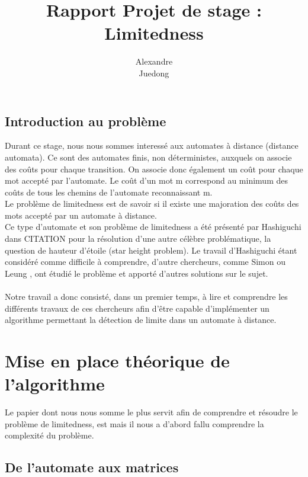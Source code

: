 \documentclass{report}
\title{\textbf{Rapport Projet de stage : Limitedness}}
\author{
\bsc {Brebant} Alexandre\\
\bsc {Xue} Juedong}
\begin{document}
\maketitle

\tableofcontents
\chapter*{Introduction au problème}
Durant ce stage, nous nous sommes interessé aux automates à distance (distance automata). Ce sont des automates finis, non déterministes, auxquels on associe des coûts pour chaque transition. On associe donc également un coût pour chaque mot accepté par l'automate. Le coût d'un mot m correspond au minimum des coûts de tous les chemins de l'automate reconnaissant m.\\
Le problème de limitedness est de savoir si il existe une majoration des coûts des mots accepté par un automate à distance.\\
Ce type d'automate et son problème de limitedness a été présenté par Hashiguchi dans CITATION pour la résolution d'une autre célèbre problématique, la question de hauteur d'étoile (star height problem). Le travail d'Hashiguchi étant considéré comme difficile à comprendre, d'autre chercheurs, comme Simon \cite{Simon:Semigroups-Matrices-over-Tropical:1994:a} ou Leung \cite{Leung&Podolskiy:limitedness-problem-distance-automata::2004:a}, ont étudié le problème et apporté d'autres solutions sur le sujet.\\\\
Notre travail a donc consisté, dans un premier temps, à lire et comprendre les différents travaux de ces chercheurs afin d'être capable d'implémenter un algorithme permettant la détection de limite dans un automate à distance.

\part{Mise en place théorique de l'algorithme}

Le papier dont nous nous somme le plus servit afin de comprendre et résoudre le problème de limitedness, est \cite{Simon:Semigroups-Matrices-over-Tropical:1994:a} mais il nous a d'abord fallu comprendre la complexité du problème.

\chapter{De l'automate aux matrices}
\end{document}
